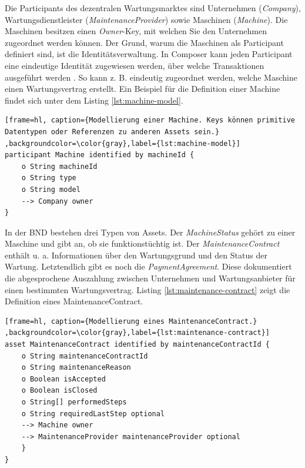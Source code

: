 Die Participants des dezentralen Wartungsmarktes sind Unternehmen (\textit{Company}), Wartungsdienstleister (\textit{MaintenanceProvider}) sowie Maschinen (\textit{Machine}). Die Maschinen besitzen einen \textit{Owner}-Key, mit welchen Sie den Unternehmen zugeordnet werden können. Der Grund, warum die Maschinen als Participant definiert sind, ist die Identitätsverwaltung. In Composer kann jeden Participant eine eindeutige Identität zugewiesen werden, über welche Transaktionen ausgeführt werden \cite{HyperledgerComposerTeamParticipantsidentitiesHyperledger}. So kann z. B. eindeutig zugeordnet werden, welche Maschine einen Wartungsvertrag erstellt. Ein Beispiel für die Definition einer Machine findet sich unter dem Listing \ref{lst:machine-model}.

\begin{lstfloat}
\begin{lstlisting}[frame=hl, caption={Modellierung einer Machine. Keys können primitive Datentypen oder Referenzen zu anderen Assets sein.} ,backgroundcolor=\color{gray},label={lst:machine-model}]
participant Machine identified by machineId {
    o String machineId
    o String type
    o String model
    --> Company owner
}
\end{lstlisting} 
\end{lstfloat}

In der \acs{BND} bestehen drei Typen von Assets. Der \textit{MachineStatus} gehört zu einer Maschine und gibt an, ob sie funktionstüchtig ist. Der \textit{MaintenanceContract} enthält u. a. Informationen über den Wartungsgrund und den Status der Wartung. Letztendlich gibt es noch die \textit{PaymentAgreement}. Diese dokumentiert die abgesprochene Auszahlung zwischen Unternehmen und Wartungsanbieter für einen bestimmten Wartungsvertrag. Listing \ref{lst:maintenance-contract} zeigt die Definition eines MaintenanceContract.

\begin{lstfloat}
\begin{lstlisting}[frame=hl, caption={Modellierung eines MaintenanceContract.} ,backgroundcolor=\color{gray},label={lst:maintenance-contract}]
asset MaintenanceContract identified by maintenanceContractId {
    o String maintenanceContractId
    o String maintenanceReason
    o Boolean isAccepted
    o Boolean isClosed
    o String[] performedSteps
    o String requiredLastStep optional
    --> Machine owner
    --> MaintenanceProvider maintenanceProvider optional
    }
}
\end{lstlisting} 
\end{lstfloat}


